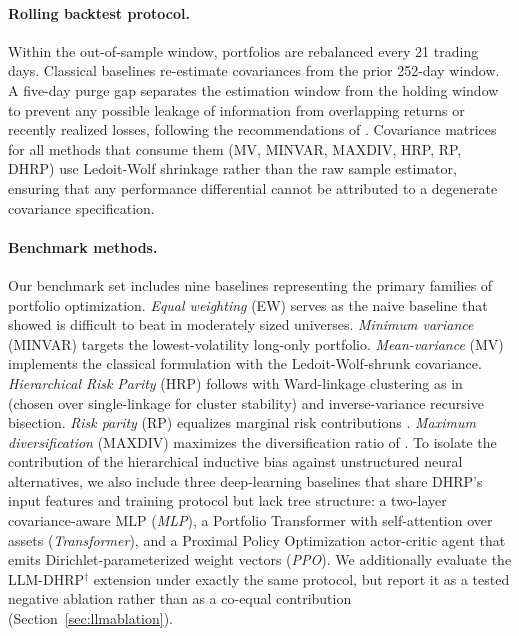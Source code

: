 \documentclass{article}
\begin{document}
\paragraph{Rolling backtest protocol.} Within the out-of-sample window, portfolios are rebalanced every 21 trading days. Classical baselines re-estimate covariances from the prior 252-day window. A five-day purge gap separates the estimation window from the holding window to prevent any possible leakage of information from overlapping returns or recently realized losses, following the recommendations of \citet{LopezdePrado2018}. Covariance matrices for all methods that consume them (MV, MINVAR, MAXDIV, HRP, RP, DHRP) use Ledoit-Wolf shrinkage \citep{Ledoit2004} rather than the raw sample estimator, ensuring that any performance differential cannot be attributed to a degenerate covariance specification.

\paragraph{Benchmark methods.} Our benchmark set includes nine baselines representing the primary families of portfolio optimization. \emph{Equal weighting} (EW) serves as the naive baseline that \citet{DeMiguel2009} showed is difficult to beat in moderately sized universes. \emph{Minimum variance} (MINVAR) targets the lowest-volatility long-only portfolio. \emph{Mean-variance} (MV) implements the classical \citet{Markowitz1952} formulation with the Ledoit-Wolf-shrunk covariance. \emph{Hierarchical Risk Parity} (HRP) follows \citet{LopezdePrado2016} with Ward-linkage clustering as in \citet{Raffinot2018} (chosen over single-linkage for cluster stability) and inverse-variance recursive bisection. \emph{Risk parity} (RP) equalizes marginal risk contributions \citep{Maillard2010}. \emph{Maximum diversification} (MAXDIV) maximizes the diversification ratio of \citet{Choueifaty2008}. To isolate the contribution of the hierarchical inductive bias against unstructured neural alternatives, we also include three deep-learning baselines that share DHRP's input features and training protocol but lack tree structure: a two-layer covariance-aware MLP (\emph{MLP}), a Portfolio Transformer with self-attention over assets \citep{KisielGorse2022} (\emph{Transformer}), and a Proximal Policy Optimization actor-critic agent \citep{Schulman2017} that emits Dirichlet-parameterized weight vectors (\emph{PPO}). We additionally evaluate the LLM-DHRP$^{\dagger}$ extension under exactly the same protocol, but report it as a tested negative ablation rather than as a co-equal contribution (Section~\ref{sec:llmablation}).
\end{document}
